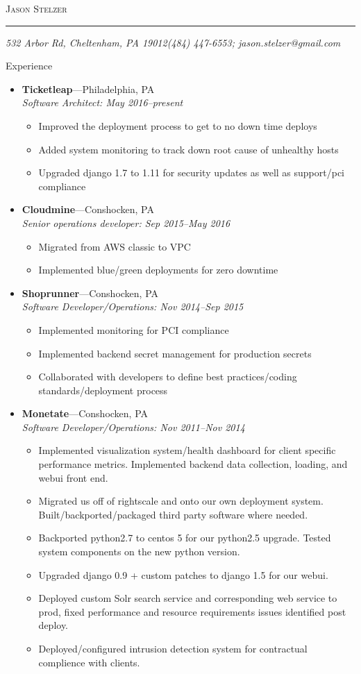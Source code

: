 \documentclass[11pt,oneside]{article}
\makeatletter
\newcommand{\name}{Jason Stelzer}
\newcommand{\addr}{532 Arbor Rd, Cheltenham, PA 19012}
\newcommand{\phone}{(484) 447-6553}
\newcommand{\email}{jason.stelzer@gmail.com}
\newcommand{\bigname}[1]{
        \begin{center}\fontfamily{phv}\selectfont\Huge\scshape#1\end{center}
}
\newenvironment{ressection}[1]{
        \vspace{4pt}
        {\fontfamily{phv}\selectfont\Large#1}
        \begin{itemize}
        \vspace{3pt}
}{
        \end{itemize}
}
\newcommand{\ressubitem}[1]{
        \vspace{-1pt}
        \item \begin{flushleft} #1 \end{flushleft}
}
\newcommand{\resbigitem}[3]{
        \vspace{-5pt}
        \item
        \textbf{#1}---#2 \\
        \textit{#3}
}
\newenvironment{ressubsec}[3]{
        \resbigitem{#1}{#2}{#3}
        \vspace{-2pt}
        \begin{itemize}
}{
        \end{itemize}
}
\makeatother
\begin{document}
 \selectfont

\bigname{\name}

\vspace{-8pt} \rule{\textwidth}{1pt}

\vspace{-1pt} {\small\itshape \addr \hfill \phone; \email}

\vspace{8 pt}

\begin{ressection}{Experience}
        \begin{ressubsec}{Ticketleap}{Philadelphia, PA}{Software Architect: May 2016--present}
          \ressubitem{Improved the deployment process to get to no down time deploys }
          \ressubitem{Added system monitoring to track down root cause of unhealthy hosts}
          \ressubitem{Upgraded django 1.7 to 1.11 for security updates as well as support/pci compliance }
        \end{ressubsec}
  
        \begin{ressubsec}{Cloudmine}{Conshocken, PA}{Senior operations developer: Sep 2015--May 2016}

          \ressubitem{Migrated from AWS classic to VPC }
          \ressubitem{Implemented blue/green deployments for zero downtime }
        \end{ressubsec}
        
        \begin{ressubsec}{Shoprunner}{Conshocken, PA}{Software Developer/Operations: Nov 2014--Sep 2015}

          \ressubitem{Implemented monitoring for PCI compliance }
          \ressubitem{Implemented backend secret management for production secrets }
          \ressubitem{Collaborated with developers to define best practices/coding standards/deployment process}

        \end{ressubsec}
        

        
        \begin{ressubsec}{Monetate}{Conshocken, PA}{Software Developer/Operations: Nov 2011--Nov 2014}

          \ressubitem{Implemented visualization system/health dashboard for client specific performance metrics. Implemented backend data collection, loading, and webui front end. }
          \ressubitem{Migrated us off of rightscale and onto our own deployment system. Built/backported/packaged third party software where needed. }
          \ressubitem{Backported python2.7 to centos 5 for our python2.5 upgrade. Tested system components on the new python version.}
          \ressubitem{Upgraded django 0.9 + custom patches to django 1.5 for our webui.}
          \ressubitem{Deployed custom Solr search service and corresponding web service to prod, fixed performance and resource requirements issues identified post deploy.}
          \ressubitem{Deployed/configured intrusion detection system for contractual complience with clients. }
        \end{ressubsec}



\end{ressection}
\end{document}
